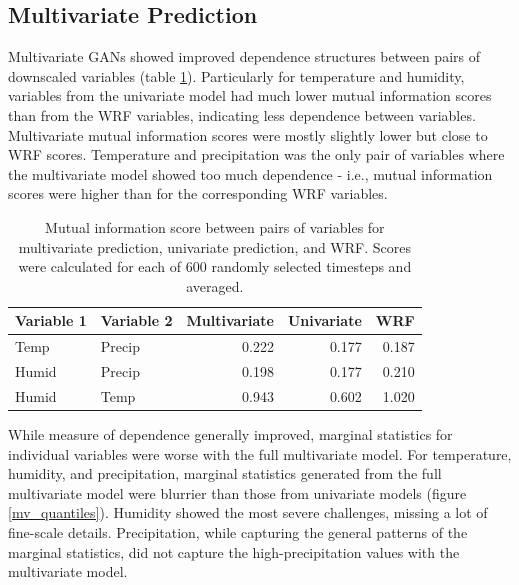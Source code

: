 \documentclass{ametsocV6.1}
\begin{document}
\subsection{Multivariate Prediction}

Multivariate GANs showed improved dependence structures between pairs of downscaled variables (table \ref{tab:my_table}). Particularly for temperature and humidity, variables from the univariate model had much lower mutual information scores than from the WRF variables, indicating less dependence between variables. Multivariate mutual information scores were mostly slightly lower but close to WRF scores. Temperature and precipitation was the only pair of variables where the multivariate model showed too much dependence - i.e., mutual information scores were higher than for the corresponding WRF variables.  
\begin{table}[ht]
\centering
\caption{Mutual information score between pairs of variables for multivariate prediction, univariate prediction, and WRF. Scores were calculated for each of 600 randomly selected timesteps and averaged. }
\label{tab:my_table}
\begin{tabular}{llrrr}
  \hline
  Variable 1& Variable 2& Multivariate& Univariate& WRF \\ 
  \hline
 Temp & Precip & 0.222 & 0.177 & 0.187 \\ 
   Humid & Precip & 0.198 & 0.177 & 0.210 \\ 
   Humid & Temp & 0.943 & 0.602 & 1.020 \\ 
   \hline
\end{tabular}
\end{table}

While measure of dependence generally improved, marginal statistics for individual variables were worse with the full multivariate model. For temperature, humidity, and precipitation, marginal statistics generated from the full multivariate model were blurrier than those from univariate models (figure \ref{mv_quantiles}). Humidity showed the most severe challenges, missing a lot of fine-scale details. Precipitation, while capturing the general patterns of the marginal statistics, did not capture the high-precipitation values with the multivariate model. 
\end{document}
